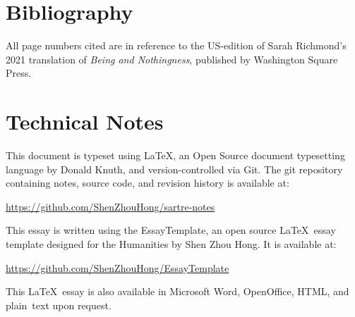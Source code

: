
\section*{Bibliography}

All page numbers cited are in reference to the US-edition of Sarah Richmond's 2021 translation of \emph{Being and Nothingness}, published by Washington Square Press.

\nocite{*}
\printbibliography[heading=none]

\section*{Technical Notes}
This document is typeset using \LaTeX, an Open Source document typesetting language
by Donald Knuth, and version-controlled via Git. The git repository containing notes, source code, and revision history is available at:

\url{https://github.com/ShenZhouHong/sartre-notes}

\noindent
This essay is written using the EssayTemplate, an open source \LaTeX\ essay
template designed for the Humanities by Shen Zhou Hong. It is available at:

\url{https://github.com/ShenZhouHong/EssayTemplate}

\vfill
\begin{center}
This \LaTeX\ essay is also available in Microsoft Word, OpenOffice, HTML, and \mbox{plain text} upon request.
\end{center}

